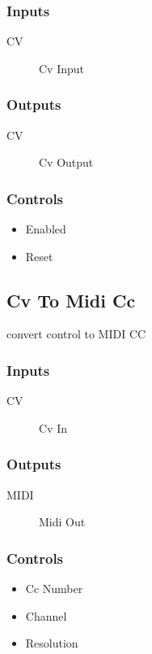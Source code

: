 \subsubsection{Inputs}
\begin{description}
\item [CV] Cv Input
\end{description}

\subsubsection{Outputs}
\begin{description}
\item [CV] Cv Output
\end{description}

\subsubsection{Controls}
\begin{itemize}
\item Enabled
\item Reset
\end{itemize}

\subsection{Cv To Midi Cc}

convert control to MIDI CC



\subsubsection{Inputs}
\begin{description}
\item [CV] Cv In
\end{description}

\subsubsection{Outputs}
\begin{description}
\item [MIDI] Midi Out
\end{description}

\subsubsection{Controls}
\begin{itemize}
\item Cc Number
\item Channel
\item Resolution
\end{itemize}

